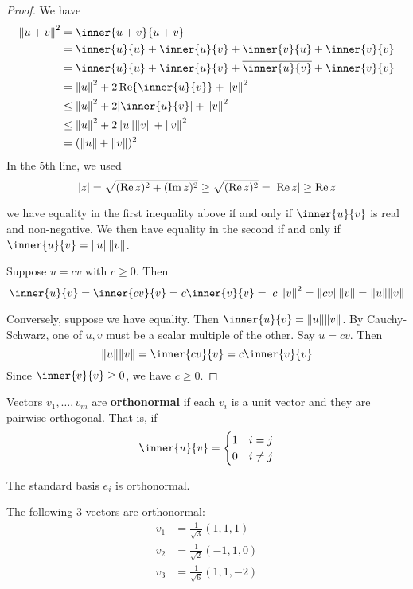 \documentclass{article}
\begin{document}
    \begin{proof}
      We have
      \begin{align*}
        \norm{u + v}^2 &= \inner{u+v}{u+v}\\
        &= \inner{u}{u} + \inner{u}{v} + \inner{v}{u} + \inner{v}{v}\\
        &= \inner{u}{u} + \inner{u}{v} + \overline{\inner{u}{v}} + \inner{v}{v}\\
        &= \norm{u}^2 + 2\Re\inner{u}{v} + \norm{v}^2\\
        &\leq \norm{u}^2 + 2\abs{\inner{u}{v}} + \norm{v}^2\\
        &\leq \norm{u}^2 + 2\norm{u}\norm{v} + \norm{v}^2\\
        &= (\norm{u}+ \norm{v})^2
      \end{align*}
      In the 5th line, we used \[
        \abs{z} = \sqrt{(\Re z)^2 + (\Im z)^2} \geq \sqrt{(\Re z)^2} = \abs{\Re z} \geq \Re z
      \]

      we have equality in the first inequality above if and only if $\inner{u}{v}$ is real and non-negative. We then have equality in the second if and only if $\inner{u}{v} = \norm{u}\norm{v}$.

      Suppose $u = cv$ with $c \geq 0$. Then \[
        \inner{u}{v} = \inner{cv}{v} = c\inner{v}{v} = \abs{c}\norm{v}^2 = \norm{cv}\norm{v} = \norm{u}\norm{v}
      \]

      Conversely, suppose we have equality. Then $\inner{u}{v} = \norm{u}\norm{v}$. By Cauchy-Schwarz, one of $u, v$ must be a scalar multiple of the other. Say $u = cv$. Then \[
        \norm{u}\norm{v} = \inner{cv}{v} = c\inner{v}{v}
      \]
      Since $\inner{v}{v} \geq 0$, we have $c \geq 0$.
    \end{proof}
    \begin{definition}
      Vectors $v_1, \ldots, v_m$ are \textbf{orthonormal} if each $v_i$ is a unit vector and they are pairwise orthogonal. That is, if \[
        \inner{u}{v} =
        \begin{cases}
          1 & i = j\\
          0 & i \neq j\\
        \end{cases}
      \]
    \end{definition}
    \begin{example}
      The standard basis $e_i$ is orthonormal.
    \end{example}
    \begin{example}
      The following 3 vectors are orthonormal:
      \begin{align*}
        v_1 &= \frac{1}{\sqrt{3}}(1, 1, 1)\\
        v_2 &= \frac{1}{\sqrt{2}}(-1, 1, 0)\\
        v_3 &= \frac{1}{\sqrt{6}}(1, 1, -2)\\
      \end{align*}
    \end{example}
\end{document}

